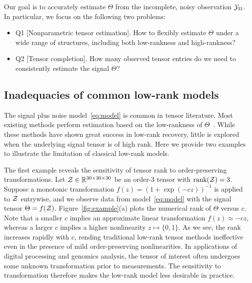 \documentclass{article}
\theoremstyle{plain}
\theoremstyle{definition}
\begin{document}
Our goal is to accurately estimate $\Theta$ from the incomplete, noisy observation $\mathcal{Y}_\Omega$. In particular, we focus on the following two problems:
\begin{itemize}[leftmargin=*]
\item Q1 [Nonparametric tensor estimation]. How to flexibly estimate $\Theta$ under a wide range of structures, including both low-rankness and high-rankness?
\item Q2 [Tensor completion]. How many observed tensor entries do we need to consistently estimate the signal $\Theta$?
\end{itemize}


\subsection{Inadequacies of common low-rank models}\label{sec:example}
The signal plus noise model~\eqref{eq:model} is common in tensor literature. Most existing methods perform estimation based on the low-rankness of $\Theta$~\cite{anandkumar2014tensor,montanari2018spectral,kadmon2018statistical,cai2019nonconvex}. While these methods have shown great success in low-rank recovery, little is explored when the underlying signal tensor is of high rank. Here we provide two examples to illustrate the limitation of classical low-rank models.

The first example reveals the sensitivity of tensor rank to order-preserving transformations. Let $\mathcal{Z} \in \mathbb{R}^{30\times 30\times 30}$ be an order-3 tensor with $\text{rank}(\mathcal{Z})=3$. Suppose a monotonic transformation $f(z)=(1+\exp(-cz))^{-1}$ is applied to $\mathcal{Z}$ entrywise, and we observe data from model~\eqref{eq:model} with the signal tensor $\Theta=f(\mathcal{Z})$. Figure~\ref{fig:example}(a) plots the numerical rank of $\Theta$ versus $c$. Note that a smaller $c$ implies an approximate linear transformation $f(z)\approx -cz$, whereas a larger $c$ implies a higher nonlinearity $z\mapsto \{0,1\}$. As we see, the rank increases rapidly with $c$, rending traditional low-rank tensor methods ineffective even in the presence of mild order-preserving nonlinearities. In applications of digital processing and genomics analysis, the tensor of interest often undergoes some unknown transformation prior to measurements. The sensitivity to transformation therefore makes the low-rank model less desirable in practice. 
\end{document}
